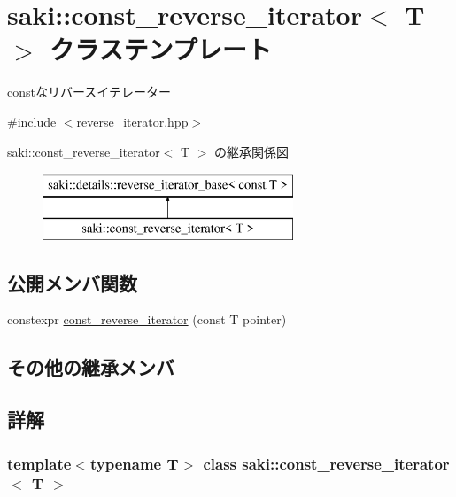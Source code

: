 \hypertarget{classsaki_1_1const__reverse__iterator}{}\section{saki\+:\+:const\+\_\+reverse\+\_\+iterator$<$ T $>$ クラステンプレート}
\label{classsaki_1_1const__reverse__iterator}


constなリバースイテレーター  




{\ttfamily \#include $<$reverse\+\_\+iterator.\+hpp$>$}

saki\+:\+:const\+\_\+reverse\+\_\+iterator$<$ T $>$ の継承関係図\begin{figure}[H]
\begin{center}
\leavevmode
\includegraphics[height=2.000000cm]{classsaki_1_1const__reverse__iterator}
\end{center}
\end{figure}
\subsection*{公開メンバ関数}
\begin{DoxyCompactItemize}
\item 
constexpr \mbox{\hyperlink{classsaki_1_1const__reverse__iterator_ae696e711d884b66fb36c20262446cfae}{const\+\_\+reverse\+\_\+iterator}} (const T pointer)
\end{DoxyCompactItemize}
\subsection*{その他の継承メンバ}


\subsection{詳解}
\subsubsection*{template$<$typename T$>$\newline
class saki\+::const\+\_\+reverse\+\_\+iterator$<$ T $>$}

